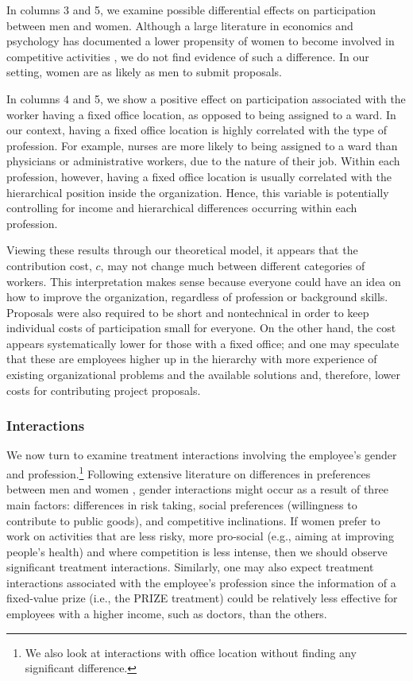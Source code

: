 \documentclass[12pt, titlepage]{article}
\begin{document}
In columns 3 and 5, we examine possible differential effects on
participation between men and women. Although a large literature in
economics and psychology \citep{croson2009gender} has documented a lower
propensity of women to become involved in competitive activities
\citep{niederle2007women}, we do not find evidence of such a difference.
In our setting, women are as likely as men to submit proposals.

In columns 4 and 5, we show a positive effect on participation
associated with the worker having a fixed office location, as opposed to
being assigned to a ward. In our context, having a fixed office location
is highly correlated with the type of profession. For example, nurses
are more likely to being assigned to a ward than physicians or
administrative workers, due to the nature of their job. Within each
profession, however, having a fixed office location is usually
correlated with the hierarchical position inside the organization.
Hence, this variable is potentially controlling for income and
hierarchical differences occurring within each profession.

Viewing these results through our theoretical model, it appears that the
contribution cost, \(c\), may not change much between different
categories of workers. This interpretation makes sense because everyone
could have an idea on how to improve the organization, regardless of
profession or background skills. Proposals were also required to be
short and nontechnical in order to keep individual costs of
participation small for everyone. On the other hand, the cost appears
systematically lower for those with a fixed office; and one may
speculate that these are employees higher up in the hierarchy with more
experience of existing organizational problems and the available
solutions and, therefore, lower costs for contributing project
proposals.

\subsubsection{Interactions}\label{interactions}

We now turn to examine treatment interactions involving the employee's
gender and profession.\footnote{We also look at interactions with office
  location without finding any significant difference.} Following
extensive literature on differences in preferences between men and women
\citep{croson2009gender}, gender interactions might occur as a result of
three main factors: differences in risk taking, social preferences
(willingness to contribute to public goods), and competitive
inclinations. If women prefer to work on activities that are less risky,
more pro-social (e.g., aiming at improving people's health) and where
competition is less intense, then we should observe significant
treatment interactions. Similarly, one may also expect treatment
interactions associated with the employee's profession since the
information of a fixed-value prize (i.e., the PRIZE treatment) could be
relatively less effective for employees with a higher income, such as
doctors, than the others.
\end{document}
